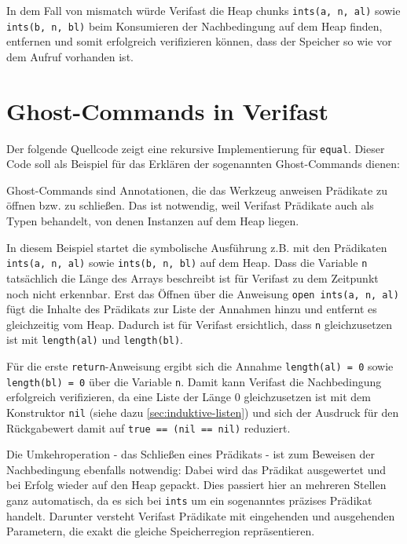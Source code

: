 In dem Fall von mismatch würde Verifast die Heap chunks \lstinline{ints(a, n, al)} sowie
\lstinline{ints(b, n, bl)} beim Konsumieren der Nachbedingung auf dem Heap finden, entfernen und
somit erfolgreich verifizieren können, dass der Speicher so wie vor dem Aufruf vorhanden ist.

\section{Ghost-Commands in Verifast}

Der folgende Quellcode zeigt eine rekursive Implementierung für \lstinline{equal}. Dieser Code
soll als Beispiel für das Erklären der sogenannten Ghost-Commands dienen:



Ghost-Commands sind Annotationen, die das Werkzeug anweisen Prädikate zu öffnen bzw. zu schließen. Das
ist notwendig, weil Verifast Prädikate auch als Typen behandelt, von denen Instanzen auf dem Heap liegen.

In diesem Beispiel startet die symbolische Ausführung z.B. mit den Prädikaten \lstinline{ints(a, n, al)} 
sowie \lstinline{ints(b, n, bl)} auf dem Heap. Dass die Variable \lstinline{n} tatsächlich die Länge
des Arrays beschreibt ist für Verifast zu dem Zeitpunkt noch nicht erkennbar. Erst das Öffnen über die
Anweisung \lstinline{open ints(a, n, al)} fügt die Inhalte des Prädikats zur Liste der Annahmen hinzu
und entfernt es gleichzeitig vom Heap. Dadurch ist für Verifast ersichtlich, dass \lstinline{n}
gleichzusetzen ist mit \texttt{length(al)} und \texttt{length(bl)}. 

Für die erste \texttt{return}-Anweisung ergibt sich die Annahme \texttt{length(al) = 0} sowie
\texttt{length(bl) = 0} über die Variable \texttt{n}. Damit kann Verifast die Nachbedingung
erfolgreich verifizieren, da eine Liste der Länge 0 gleichzusetzen ist mit dem Konstruktor
\texttt{nil} (siehe dazu \ref{sec:induktive-listen}) und sich der Ausdruck für den Rückgabewert
damit auf \texttt{true == (nil == nil)} reduziert.

Die Umkehroperation - das Schließen eines Prädikats - ist zum Beweisen der Nachbedingung ebenfalls notwendig:
Dabei wird das Prädikat ausgewertet und bei Erfolg wieder auf den Heap gepackt. Dies passiert hier an mehreren 
Stellen ganz automatisch, da es sich bei \lstinline{ints} um ein sogenanntes präzises Prädikat handelt. 
Darunter versteht Verifast Prädikate mit eingehenden und ausgehenden Parametern, die exakt die gleiche 
Speicherregion repräsentieren. 

